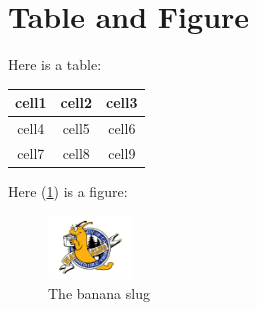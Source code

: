 \documentclass[%
	12pt, %
]{scrbook} %
\begin{document}
\section{Table and Figure}
Here is a table:
\begin{center}
	\begin{tabular}{ c | c c }
		cell1 & cell2 & cell3 \\ 
		\hline
		cell4 & cell5 & cell6 \\  
		cell7 & cell8 & cell9    
	 \end{tabular}
\end{center}
Here (\cref{fig:logo}) is a figure:
\begin{figure}[h!]
	\centering
  \includegraphics[width=0.2\textwidth]{images/UCSC-logo.png}
  \caption{The banana slug}
  \label{fig:logo}
\end{figure}
\clearpage
\end{document}
